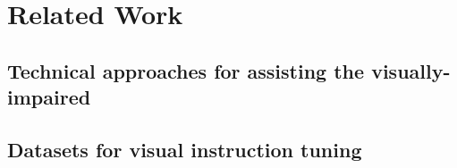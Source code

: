 \section{Related Work}
\subsection{Technical approaches for assisting the visually-impaired}


\subsection{Datasets for visual instruction tuning}
